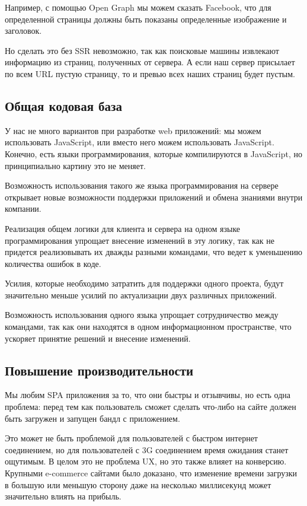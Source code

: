 Например, с помощью Open Graph мы можем сказать Facebook, что для определенной страницы должны быть показаны определенные изображение и заголовок.

Но сделать это без SSR невозможно, так как поисковые машины извлекают информацию из страниц, полученных от сервера. А если наш сервер присылает по всем URL пустую страницу, то и превью всех наших страниц будет пустым.


\subsection{Общая кодовая база}

У нас не много вариантов при разработке web приложений: мы можем использовать JavaScript, или вместо него можем использовать JavaScript. Конечно, есть языки программирования, которые компилируются в JavaScript, но принципиально картину это не меняет.

Возможность использования такого же языка программирования на сервере открывает новые возможности поддержки приложений и обмена знаниями внутри компании. 

Реализация общем логики для клиента и сервера на одном языке программирования упрощает внесение изменений в эту логику, так как не придется реализовывать их дважды разными командами, что ведет к уменьшению количества ошибок в коде. 

Усилия, которые необходимо затратить для поддержки одного проекта, будут значительно меньше усилий по актуализации двух различных приложений.

Возможность использования одного языка упрощает сотрудничество между командами, так как они находятся в одном информационном пространстве, что ускоряет принятие решений и внесение изменений.

\subsection{Повышение производительности}

Мы любим SPA приложения за то, что они быстры и отзывчивы, но есть одна проблема: перед тем как пользователь сможет сделать что-либо на сайте должен быть загружен и запущен бандл с приложением.

Это может не быть проблемой для пользователей с быстром интернет соединением, но для пользователей с 3G соединением время ожидания станет ощутимым. В целом это не проблема UX, но это также влияет на конверсию. Крупными e-commerce сайтами было доказано, что изменение времени загрузки в большую или меньшую сторону даже на несколько миллисекунд может значительно влиять на прибыль.

